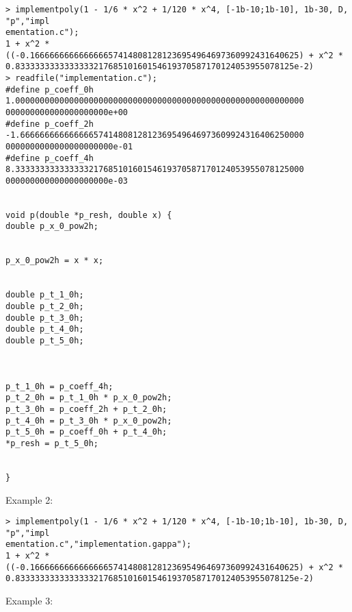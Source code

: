 \begin{center}\begin{minipage}{15cm}\begin{Verbatim}[frame=single]
> implementpoly(1 - 1/6 * x^2 + 1/120 * x^4, [-1b-10;1b-10], 1b-30, D, "p","impl
ementation.c");
1 + x^2 * ((-0.1666666666666666574148081281236954964697360992431640625) + x^2 * 
0.833333333333333321768510160154619370587170124053955078125e-2)
> readfile("implementation.c");
#define p_coeff_0h 1.00000000000000000000000000000000000000000000000000000000000
000000000000000000000e+00
#define p_coeff_2h -1.6666666666666665741480812812369549646973609924316406250000
0000000000000000000000e-01
#define p_coeff_4h 8.33333333333333321768510160154619370587170124053955078125000
000000000000000000000e-03


void p(double *p_resh, double x) {
double p_x_0_pow2h;


p_x_0_pow2h = x * x;


double p_t_1_0h;
double p_t_2_0h;
double p_t_3_0h;
double p_t_4_0h;
double p_t_5_0h;
 


p_t_1_0h = p_coeff_4h;
p_t_2_0h = p_t_1_0h * p_x_0_pow2h;
p_t_3_0h = p_coeff_2h + p_t_2_0h;
p_t_4_0h = p_t_3_0h * p_x_0_pow2h;
p_t_5_0h = p_coeff_0h + p_t_4_0h;
*p_resh = p_t_5_0h;


}

\end{Verbatim}
\end{minipage}\end{center}
\noindent Example 2: 
\begin{center}\begin{minipage}{15cm}\begin{Verbatim}[frame=single]
> implementpoly(1 - 1/6 * x^2 + 1/120 * x^4, [-1b-10;1b-10], 1b-30, D, "p","impl
ementation.c","implementation.gappa");
1 + x^2 * ((-0.1666666666666666574148081281236954964697360992431640625) + x^2 * 
0.833333333333333321768510160154619370587170124053955078125e-2)
\end{Verbatim}
\end{minipage}\end{center}
\noindent Example 3: 
